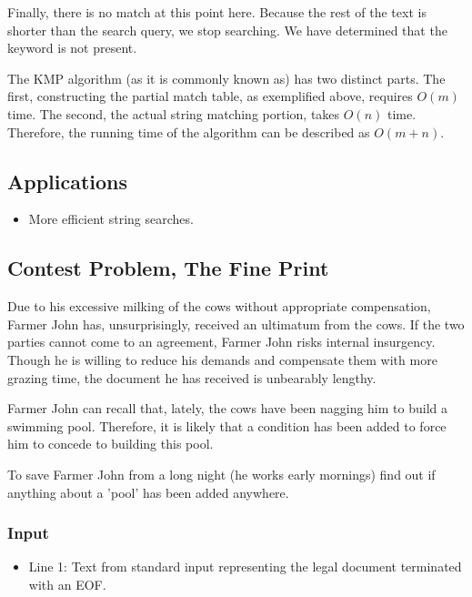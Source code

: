 Finally, there is no match at this point here.
Because the rest of the text is shorter than the search query, we stop searching.
We have determined that the keyword is not present.

The KMP algorithm (as it is commonly known as) has two distinct parts.
The first, constructing the partial match table, as exemplified above, requires $O(m)$ time.
The second, the actual string matching portion, takes $O(n)$ time.
Therefore, the running time of the algorithm can be described as $O(m + n)$.

\subsection{Applications}
\begin{itemize}
	\item More efficient string searches.
\end{itemize}

\subsection{Contest Problem, The Fine Print}
Due to his excessive milking of the cows without appropriate compensation, Farmer John has, unsurprisingly, received an ultimatum from the cows.
If the two parties cannot come to an agreement, Farmer John risks internal insurgency.
Though he is willing to reduce his demands and compensate them with more grazing time, the document he has received is unbearably lengthy.

Farmer John can recall that, lately, the cows have been nagging him to build a swimming pool.
Therefore, it is likely that a condition has been added to force him to concede to building this pool.

To save Farmer John from a long night (he works early mornings) find out if anything about a 'pool' has been added anywhere.

\subsubsection{Input}
\begin{itemize}
	\item Line 1: Text from standard input representing the legal document terminated with an EOF.
\end{itemize}


